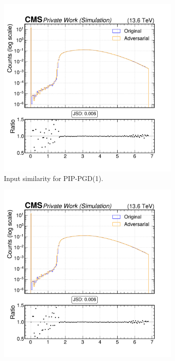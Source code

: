 \begin{figure}[h]
  \centering
  \begin{subfigure}[t]{0.32\textwidth}
    \includegraphics[width=\linewidth]{media/output/features/compare/combined_it_1/cmp_cpf_arr_Cpfcan_BtagPf_trackEtaRel.pdf}
    \caption*{Input similarity for PIP-PGD(1).}
  \end{subfigure}\hfill
  \begin{subfigure}[t]{0.32\textwidth}
    \includegraphics[width=\linewidth]{media/output/features/compare/combined_it_2/cmp_cpf_arr_Cpfcan_BtagPf_trackEtaRel.pdf}

\end{subfigure}
\end{figure}
